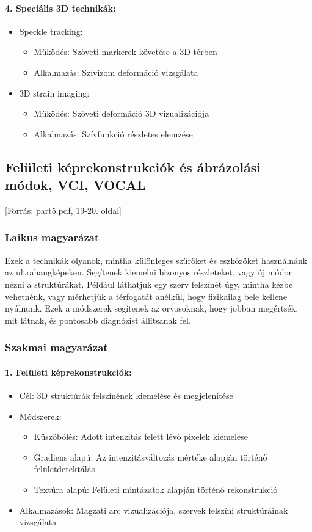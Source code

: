 \documentclass[a4paper,12pt]{article}
\begin{document}
\paragraph{4. Speciális 3D technikák:} \begin{itemize} \item Speckle tracking: \begin{itemize} \item Működés: Szöveti markerek követése a 3D térben \item Alkalmazás: Szívizom deformáció vizsgálata \end{itemize} \item 3D strain imaging: \begin{itemize} \item Működés: Szöveti deformáció 3D vizualizációja \item Alkalmazás: Szívfunkció részletes elemzése \end{itemize} \end{itemize}

\subsection{Felületi képrekonstrukciók és ábrázolási módok, VCI, VOCAL} [Forrás: part5.pdf, 19-20. oldal]

\subsubsection{Laikus magyarázat} Ezek a technikák olyanok, mintha különleges szűrőket és eszközöket használnánk az ultrahangképeken. Segítenek kiemelni bizonyos részleteket, vagy új módon nézni a struktúrákat. Például láthatjuk egy szerv felszínét úgy, mintha kézbe vehetnénk, vagy mérhetjük a térfogatát anélkül, hogy fizikailag bele kellene nyúlnunk. Ezek a módszerek segítenek az orvosoknak, hogy jobban megértsék, mit látnak, és pontosabb diagnózist állítsanak fel.

\subsubsection{Szakmai magyarázat}

\paragraph{1. Felületi képrekonstrukciók:} \begin{itemize} \item Cél: 3D struktúrák felszínének kiemelése és megjelenítése \item Módszerek: \begin{itemize} \item Küszöbölés: Adott intenzitás felett lévő pixelek kiemelése \item Gradiens alapú: Az intenzitásváltozás mértéke alapján történő felületdetektálás \item Textúra alapú: Felületi mintázatok alapján történő rekonstrukció \end{itemize} \item Alkalmazások: Magzati arc vizualizációja, szervek felszíni struktúráinak vizsgálata \end{itemize}
\end{document}
